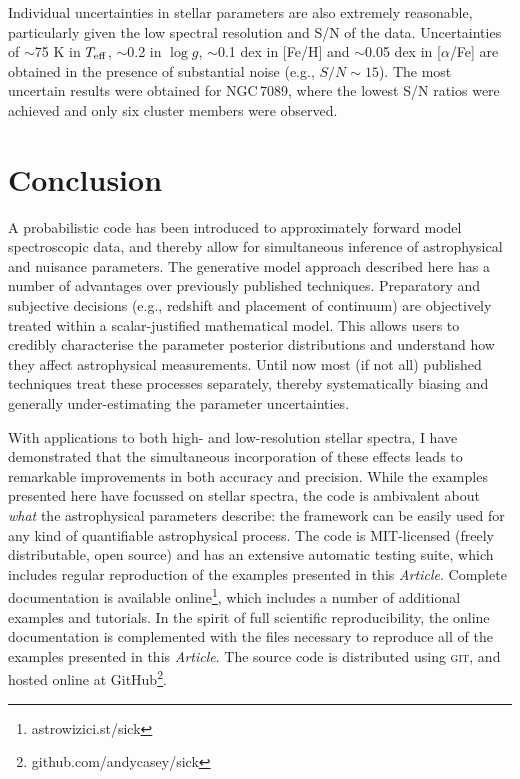\documentclass[iop]{emulateapj}
\newcommand{\article}{\textit{Article}}
\begin{document}
Individual uncertainties in stellar parameters are also extremely reasonable, 
particularly given the low spectral resolution and S/N of the data. Uncertainties 
of $\sim$75 K in $T_{\rm eff}$, $\sim$0.2 in $\log{g}$, $\sim$0.1 dex in [Fe/H] 
and $\sim$0.05 dex in [$\alpha$/Fe] are obtained in the presence of substantial 
noise (e.g., $S/N \sim 15$). The most uncertain results were obtained for 
{NGC\,7089}, where the lowest S/N ratios were achieved and only six cluster members were 
observed.

\section{Conclusion}
\label{sec:conclusions}

A probabilistic code has been introduced to approximately forward model 
spectroscopic data, and thereby allow for simultaneous inference of astrophysical 
and nuisance parameters. The generative model approach described here has a number 
of advantages over previously published techniques. Preparatory and subjective 
decisions (e.g., redshift and placement of continuum) are objectively treated 
within a scalar-justified mathematical model. This allows users to credibly 
characterise the parameter posterior distributions and understand how they affect 
astrophysical measurements. Until now most (if not all) published techniques treat 
these processes separately, thereby systematically biasing and generally 
under-estimating the parameter uncertainties.

With applications to both high- and low-resolution stellar spectra, I have 
demonstrated that the simultaneous incorporation of these effects leads to 
remarkable improvements in both accuracy and precision. While the examples 
presented here have focussed on stellar spectra, the code is ambivalent about 
\textit{what} the astrophysical parameters describe: the framework can be easily 
used for any kind of quantifiable astrophysical process. The code is MIT-licensed 
(freely distributable, open source) and has an extensive automatic testing suite, 
which includes regular reproduction of the examples presented in this \article{}. 
Complete documentation is available online\footnote{astrowizici.st/sick}, 
which includes a number of additional examples and tutorials. In the spirit of 
full scientific reproducibility, the online documentation is complemented with the 
files necessary to reproduce all of the examples presented in this \article{}. 
The source code is distributed using \textsc{git}, and hosted online at 
GitHub\footnote{github.com/andycasey/sick}. 
\end{document}
